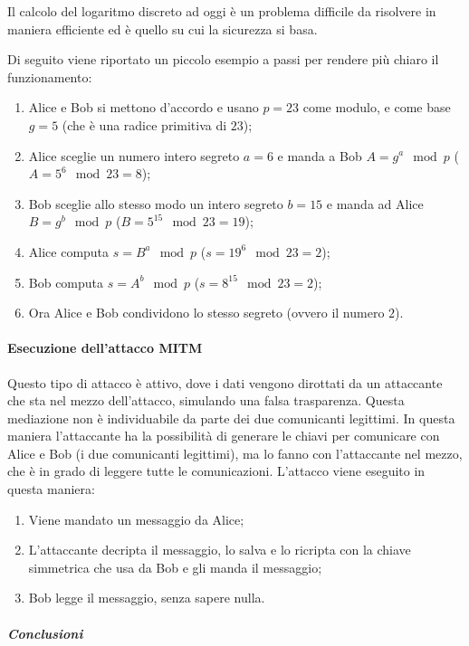 Il calcolo del logaritmo discreto ad oggi è un problema difficile da
risolvere in maniera efficiente ed è quello su cui la sicurezza si basa.


Di seguito viene riportato un piccolo esempio a passi per rendere più chiaro
il funzionamento:
\begin{enumerate}
 \item Alice e Bob si mettono d'accordo e usano $p = 23$ come modulo, e come
base $g = 5$ (che \`e una radice primitiva di $23$);
 \item Alice sceglie un numero intero segreto $a = 6$ e manda a Bob $A = g^a
\mod p$ ($A = 5^6 \mod 23 = 8$);
 \item Bob sceglie allo stesso modo un intero segreto $b = 15$ e manda ad Alice
$B = g^b \mod p$ ($B = 5^{15} \mod 23 = 19$);
 \item Alice computa $s = B^a \mod p$ ($s = 19^6 \mod 23 = 2$);
 \item Bob computa $s = A^b \mod p$ ($s = 8^{15} \mod 23 = 2$);
 \item Ora Alice e Bob condividono lo stesso segreto (ovvero il numero $2$).

\end{enumerate}


\paragraph{Esecuzione dell'attacco MITM}

Questo tipo di attacco è attivo, dove i dati vengono dirottati da un attaccante
che sta nel mezzo dell'attacco, simulando una falsa trasparenza. Questa
mediazione non è individuabile da parte dei due comunicanti legittimi. In
questa maniera l'attaccante ha la possibilità di generare le chiavi per
comunicare con Alice e Bob (i due comunicanti legittimi), ma lo fanno con
l'attaccante nel mezzo, che è in grado di leggere tutte le comunicazioni.
L'attacco viene eseguito in questa maniera:
\begin{enumerate}
\item Viene mandato un messaggio da Alice;
\item L'attaccante decripta il messaggio, lo salva e lo ricripta con la chiave
simmetrica che usa da Bob e gli manda il messaggio;
\item Bob legge il messaggio, senza sapere nulla.
\end{enumerate}


\subparagraph{Conclusioni}

